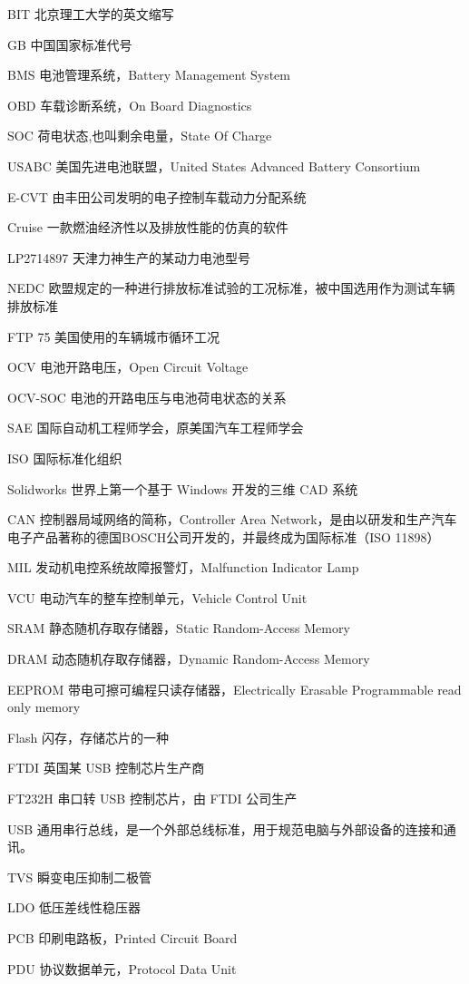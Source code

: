 \begin{denotation}
	
\item[BIT] 北京理工大学的英文缩写
\item[GB] 中国国家标准代号
\item[BMS] 电池管理系统，Battery Management System
\item[OBD] 车载诊断系统，On Board Diagnostics
\item[SOC] 荷电状态,也叫剩余电量，State Of Charge
\item[USABC] 美国先进电池联盟，United States Advanced Battery Consortium
\item[E-CVT] 由丰田公司发明的电子控制车载动力分配系统
\item[Cruise] 一款燃油经济性以及排放性能的仿真的软件
\item[LP2714897] 天津力神生产的某动力电池型号
\item[NEDC] 欧盟规定的一种进行排放标准试验的工况标准，被中国选用作为测试车辆排放标准
\item[FTP 75] 美国使用的车辆城市循环工况
\item[OCV] 电池开路电压，Open Circuit Voltage
\item[OCV-SOC] 电池的开路电压与电池荷电状态的关系
\item[SAE] 国际自动机工程师学会，原美国汽车工程师学会
\item[ISO] 国际标准化组织
\item[Solidworks] 世界上第一个基于 Windows 开发的三维 CAD 系统
\item[CAN] 控制器局域网络的简称，Controller Area Network，是由以研发和生产汽车电子产品著称的德国BOSCH公司开发的，并最终成为国际标准（ISO 11898）
\item[MIL] 发动机电控系统故障报警灯，Malfunction Indicator Lamp
\item[VCU] 电动汽车的整车控制单元，Vehicle Control Unit
\item[SRAM] 静态随机存取存储器，Static Random-Access Memory
\item[DRAM] 动态随机存取存储器，Dynamic Random-Access Memory
\item[EEPROM] 带电可擦可编程只读存储器，Electrically Erasable Programmable read only memory
\item[Flash] 闪存，存储芯片的一种
\item[FTDI] 英国某 USB 控制芯片生产商
\item[FT232H] 串口转 USB 控制芯片，由 FTDI 公司生产
\item[USB] 通用串行总线，是一个外部总线标准，用于规范电脑与外部设备的连接和通讯。
\item[TVS] 瞬变电压抑制二极管
\item[LDO] 低压差线性稳压器
\item[PCB] 印刷电路板，Printed Circuit Board
\item[PDU] 协议数据单元，Protocol Data Unit
\end{denotation}
